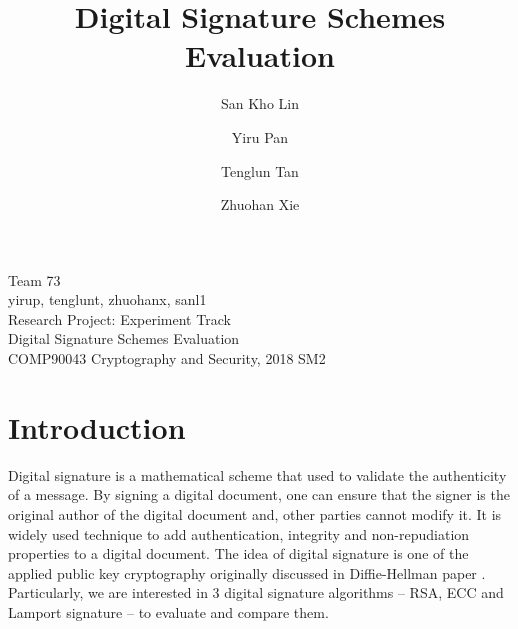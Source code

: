 \documentclass[10pt,sigconf]{acmart}
\begin{document}
\vspace{2em}

\noindent Team 73 \\
yirup, tenglunt, zhuohanx, sanl1 \\
Research Project: Experiment Track \\
Digital Signature Schemes Evaluation \\
COMP90043 Cryptography and Security, 2018 SM2

\newpage




\title{Digital Signature Schemes Evaluation}


\author{San Kho Lin}

\author{Yiru Pan}

\author{Tenglun Tan}

\author{Zhuohan Xie}



\maketitle

\section{Introduction}

Digital signature is a mathematical scheme that used to validate the authenticity of a message. By signing a digital document, one can ensure that the signer is the original author of the digital document and, other parties cannot modify it. It is widely used technique to add authentication, integrity and non-repudiation properties to a digital document. The idea of digital signature is one of the applied public key cryptography originally discussed in Diffie-Hellman paper \cite{Diffie:2006:NDC:2263321.2269104}. %
Particularly, we are interested in 3 digital signature algorithms -- RSA, ECC and Lamport signature -- to evaluate and compare them.
\end{document}
